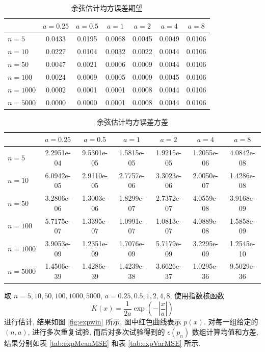 \documentclass[openany]{ctexbook}
\theoremstyle{kaiti}
\theoremstyle{normal}
\begin{document}
\begin{table}[htbp]
  \centering
  \begin{tabular}{l|cccccc}
  \hline
           & $a=0.25$ & $a=0.5$ & $a=1$  & $a=2$  & $a=4$  & $a=8$  \\ \hline
  $n=5$    & 0.0433   & 0.0195  & 0.0068 & 0.0045 & 0.0049 & 0.0106 \\
  $n=10$   & 0.0227   & 0.0104  & 0.0032 & 0.0022 & 0.0044 & 0.0106 \\
  $n=50$   & 0.0047   & 0.0021  & 0.0006 & 0.0009 & 0.0044 & 0.0106 \\
  $n=100$  & 0.0024   & 0.0009  & 0.0005 & 0.0009 & 0.0045 & 0.0106 \\
  $n=1000$ & 0.0002   & 0.0001  & 0.0001 & 0.0008 & 0.0044 & 0.0106 \\
  $n=5000$ & 0.0000   & 0.0000  & 0.0001 & 0.0008 & 0.0044 & 0.0106 \\ \hline
  \end{tabular}
  \caption{余弦估计均方误差期望}
  \label{tab:cosMeanMSE}
\end{table}

\begin{table}[htbp]
  \centering
  \begin{tabular}{l|cccccc}
    \hline
             & $a=0.25$   & $a=0.5$    & $a=1$      & $a=2$      & $a=4$      & $a=8$      \\ \hline
    $n=5$    & 2.2951e-04 & 9.5301e-05 & 1.5815e-05 & 1.9215e-05 & 1.2055e-06 & 4.0842e-08 \\
    $n=10$   & 6.0942e-05 & 2.9110e-05 & 2.7757e-06 & 3.3023e-06 & 2.0050e-07 & 1.4286e-08 \\
    $n=50$   & 3.2806e-06 & 1.3003e-06 & 1.8299e-07 & 2.7372e-07 & 4.0559e-08 & 3.9168e-09 \\
    $n=100$  & 5.7175e-07 & 1.3395e-07 & 1.0991e-07 & 1.0813e-07 & 4.0889e-08 & 1.5858e-09 \\
    $n=1000$ & 3.9053e-09 & 1.2351e-09 & 1.7076e-09 & 5.7179e-09 & 3.2295e-09 & 1.2545e-10 \\
    $n=5000$ & 1.4506e-39 & 1.4286e-39 & 1.4239e-38 & 3.6626e-37 & 1.0295e-36 & 9.5029e-36 \\ \hline
  \end{tabular}
  \caption{余弦估计均方误差方差}
  \label{tab:cosVarMSE}
\end{table}

取 $n=5,10,50,100,1000,5000$, $a=0.25,0.5,1,2,4,8$, 使用指数核函数
\begin{equation}
  K(x)=\frac{1}{2a}\exp\left(-\left\lvert\frac{x}{a}\right\rvert\right)
\end{equation} 
进行估计, 结果如图 \ref{fig:expwin} 所示, 图中红色曲线表示 $p(x)$. 对每一组给定的 $(n,a)$, 进行多次重复试验, 而后对多次试验得到的 $\epsilon(p_n)$ 数组计算均值和方差, 结果分别如表 \ref{tab:expMeanMSE} 和表 \ref{tab:expVarMSE} 所示.
\end{document}
